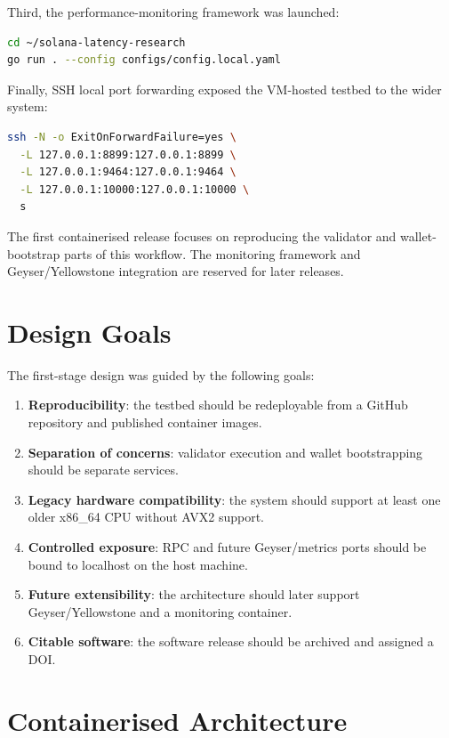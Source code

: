 \documentclass[11pt,a4paper]{article}
\begin{document}
Third, the performance-monitoring framework was launched:

\begin{lstlisting}[language=bash]
cd ~/solana-latency-research
go run . --config configs/config.local.yaml
\end{lstlisting}

Finally, SSH local port forwarding exposed the VM-hosted testbed to the wider system:

\begin{lstlisting}[language=bash]
ssh -N -o ExitOnForwardFailure=yes \
  -L 127.0.0.1:8899:127.0.0.1:8899 \
  -L 127.0.0.1:9464:127.0.0.1:9464 \
  -L 127.0.0.1:10000:127.0.0.1:10000 \
  s
\end{lstlisting}

The first containerised release focuses on reproducing the validator and wallet-bootstrap parts of this workflow. The monitoring framework and Geyser/Yellowstone integration are reserved for later releases.

\section{Design Goals}

The first-stage design was guided by the following goals:

\begin{enumerate}[leftmargin=2em]
  \item \textbf{Reproducibility}: the testbed should be redeployable from a GitHub repository and published container images.
  \item \textbf{Separation of concerns}: validator execution and wallet bootstrapping should be separate services.
  \item \textbf{Legacy hardware compatibility}: the system should support at least one older x86\_64 CPU without AVX2 support.
  \item \textbf{Controlled exposure}: RPC and future Geyser/metrics ports should be bound to localhost on the host machine.
  \item \textbf{Future extensibility}: the architecture should later support Geyser/Yellowstone and a monitoring container.
  \item \textbf{Citable software}: the software release should be archived and assigned a DOI.
\end{enumerate}

\section{Containerised Architecture}
\end{document}

